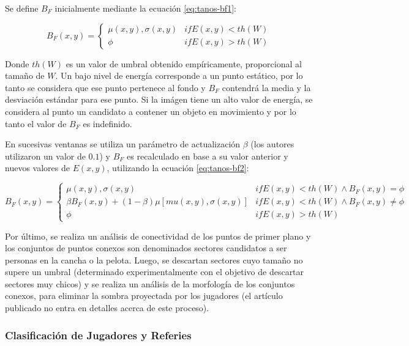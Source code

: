 \documentclass[a4paper,10pt]{article}
\begin{document}
Se define $B_F$ inicialmente mediante la ecuación \ref{eq:tanos-bf1}:

\begin{equation}
  \label{eq:tanos-bf1}
  B_F(x, y) =
  \begin{cases}
    \mu(x, y), \sigma(x, y) & if E(x, y) < th(W) \\
    \phi & if E(x, y) > th(W)
  \end{cases}
\end{equation}

Donde $th(W)$ es un valor de umbral obtenido empíricamente, proporcional al
tamaño de $W$. Un bajo nivel de energía corresponde a un punto estático,
por lo tanto se considera que ese punto pertenece al fondo y $B_F$
contendrá la media y la desviación estándar para ese punto. Si la imágen
tiene un alto valor de energía, se considera al punto un candidato a
contener un objeto en movimiento y por lo tanto el valor de $B_F$ es
indefinido.

En sucesivas ventanas se utiliza un parámetro de actualización $\beta$ (los
autores utilizaron un valor de $0.1$) y $B_F$ es recalculado en base a su valor
anterior y nuevos valores de $E(x, y)$, utilizando la ecuación
\ref{eq:tanos-bf2}:

\begin{equation} \label{eq:tanos-bf2}
  B_F(x, y) = \begin{cases}
    \mu(x, y), \sigma(x, y) & if E(x, y) < th(W) \wedge B_F(x, y) = \phi \\
    \beta B_F(x, y) + (1-\beta) \mu\left[mu(x, y), \sigma(x, y)\right] & if E(x, y) < th(W) \wedge B_F(x, y) \neq \phi \\
    \phi & if E(x, y) > th(W)
  \end{cases}
\end{equation}

Por último, se realiza un análisis de conectividad de los puntos de primer
plano y los conjuntos de puntos conexos son denominados sectores candidatos
a ser personas en la cancha o la pelota. Luego, se descartan sectores
cuyo tamaño no supere un umbral (determinado experimentalmente con el
objetivo de descartar sectores muy chicos) y se realiza un análisis de la
morfología de los conjuntos conexos, para eliminar la sombra proyectada por los
jugadores (el artículo publicado no entra en detalles acerca de este proceso).

\subsubsection{Clasificación de Jugadores y Referies}
\end{document}
